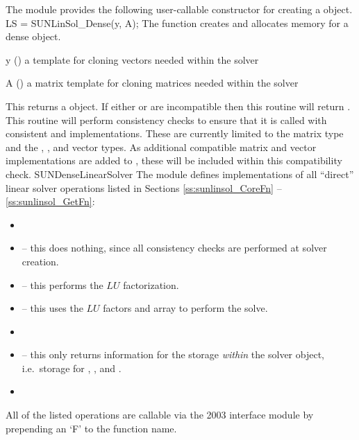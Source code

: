 The {\sunlinsoldense} module provides the following user-callable constructor
for creating a \newline {} object.
%
%
{
  LS = SUNLinSol\_Dense(y, A);
}
{
  The function  creates and allocates memory for
  a dense \newline {} object.
}
{
  \begin{args}[y]
  \item[y] ()
    a template for cloning vectors needed within the solver
  \item[A] ()
    a {\sunmatdense} matrix template for cloning matrices needed
    within the solver 
  \end{args}
}
{
  This returns a  object.  If either  or
   are incompatible then this routine will return .
}
{
  This routine will perform consistency checks to ensure that it is
  called with consistent {\nvector} and {\sunmatrix} implementations.
  These are currently limited to the {\sunmatdense} matrix type and
  the {\nvecs}, {\nvecopenmp}, and {\nvecpthreads} vector types.  As
  additional compatible matrix and vector implementations are added to
  {\sundials}, these will be included within this compatibility check.
}
{SUNDenseLinearSolver}
%
%
The {\sunlinsoldense} module defines implementations of all
``direct'' linear solver operations listed in Sections
\ref{ss:sunlinsol_CoreFn} -- \ref{ss:sunlinsol_GetFn}:
\begin{itemize}
\item {}
\item {} -- this does nothing, since all
  consistency checks are performed at solver creation.
\item {} -- this performs the $LU$ factorization.
\item {} -- this uses the $LU$ factors
  and  array to perform the solve.
\item {}
\item {} -- this only returns information for
  the storage \emph{within} the solver object, i.e.~storage
  for , , and .
\item {}
\end{itemize}
All of the listed operations are callable via the {\F} 2003 interface module
by prepending an `F' to the function name.


